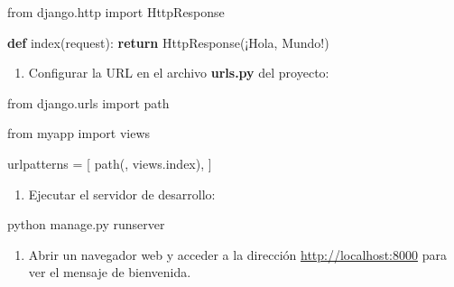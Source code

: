 \documentclass[
  a4paper,
  DIV=11,
  numbers=noendperiod,
  onepage,
  openany]{scrreprt}
\newenvironment{Shaded}{\begin{snugshade}}{\end{snugshade}}
\newcommand{\ControlFlowTok}[1]{\textcolor[rgb]{0.00,0.23,0.31}{\textbf{#1}}}
\newcommand{\ExtensionTok}[1]{\textcolor[rgb]{0.00,0.23,0.31}{#1}}
\newcommand{\ImportTok}[1]{\textcolor[rgb]{0.00,0.46,0.62}{#1}}
\newcommand{\KeywordTok}[1]{\textcolor[rgb]{0.00,0.23,0.31}{\textbf{#1}}}
\newcommand{\NormalTok}[1]{\textcolor[rgb]{0.00,0.23,0.31}{#1}}
\newcommand{\OperatorTok}[1]{\textcolor[rgb]{0.37,0.37,0.37}{#1}}
\newcommand{\StringTok}[1]{\textcolor[rgb]{0.13,0.47,0.30}{#1}}
\providecommand{\tightlist}{%
  \setlength{\itemsep}{0pt}\setlength{\parskip}{0pt}}\usepackage{longtable,booktabs,array}
\begin{document}
\begin{Shaded}
\begin{Highlighting}[]
\ImportTok{from}\NormalTok{ django.http }\ImportTok{import}\NormalTok{ HttpResponse}

\KeywordTok{def}\NormalTok{ index(request):}
    \ControlFlowTok{return}\NormalTok{ HttpResponse(}\StringTok{\textquotesingle{}¡Hola, Mundo!\textquotesingle{}}\NormalTok{)}
\end{Highlighting}
\end{Shaded}

\begin{enumerate}
\def\labelenumi{\arabic{enumi}.}
\setcounter{enumi}{6}
\tightlist
\item
  Configurar la URL en el archivo \textbf{urls.py} del proyecto:
\end{enumerate}

\begin{Shaded}
\begin{Highlighting}[]
\ImportTok{from}\NormalTok{ django.urls }\ImportTok{import}\NormalTok{ path}

\ImportTok{from}\NormalTok{ myapp }\ImportTok{import}\NormalTok{ views}

\NormalTok{urlpatterns }\OperatorTok{=}\NormalTok{ [}
\NormalTok{    path(}\StringTok{\textquotesingle{}\textquotesingle{}}\NormalTok{, views.index),}
\NormalTok{]}
\end{Highlighting}
\end{Shaded}

\begin{enumerate}
\def\labelenumi{\arabic{enumi}.}
\setcounter{enumi}{7}
\tightlist
\item
  Ejecutar el servidor de desarrollo:
\end{enumerate}

\begin{Shaded}
\begin{Highlighting}[]
\ExtensionTok{python}\NormalTok{ manage.py runserver}
\end{Highlighting}
\end{Shaded}

\begin{enumerate}
\def\labelenumi{\arabic{enumi}.}
\setcounter{enumi}{8}
\tightlist
\item
  Abrir un navegador web y acceder a la dirección
  \url{http://localhost:8000} para ver el mensaje de bienvenida.
\end{enumerate}
\end{document}
